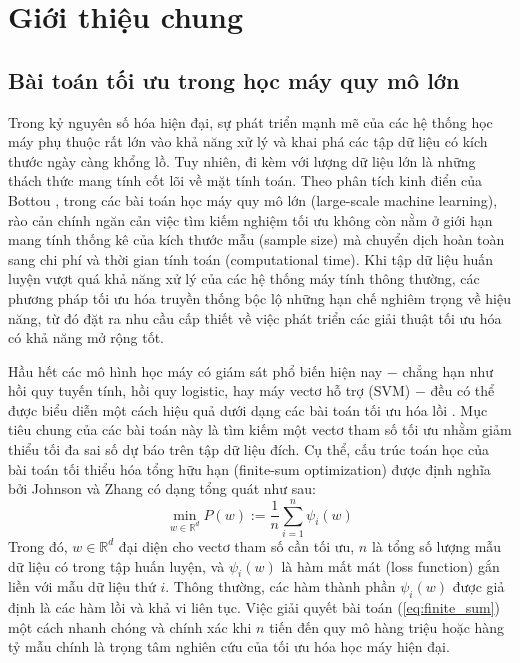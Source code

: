 \chapter{Giới thiệu chung}

\section{Bài toán tối ưu trong học máy quy mô lớn}

Trong kỷ nguyên số hóa hiện đại, sự phát triển mạnh mẽ của các hệ thống học máy phụ thuộc rất lớn vào khả năng xử lý và khai phá các tập dữ liệu có kích thước ngày càng khổng lồ. Tuy nhiên, đi kèm với lượng dữ liệu lớn là những thách thức mang tính cốt lõi về mặt tính toán. Theo phân tích kinh điển của Bottou \cite{bottou2010large}, trong các bài toán học máy quy mô lớn (large-scale machine learning), rào cản chính ngăn cản việc tìm kiếm nghiệm tối ưu không còn nằm ở giới hạn mang tính thống kê của kích thước mẫu (sample size) mà chuyển dịch hoàn toàn sang chi phí và thời gian tính toán (computational time). Khi tập dữ liệu huấn luyện vượt quá khả năng xử lý của các hệ thống máy tính thông thường, các phương pháp tối ưu hóa truyền thống bộc lộ những hạn chế nghiêm trọng về hiệu năng, từ đó đặt ra nhu cầu cấp thiết về việc phát triển các giải thuật tối ưu hóa có khả năng mở rộng tốt.

Hầu hết các mô hình học máy có giám sát phổ biến hiện nay $-$ chẳng hạn như hồi quy tuyến tính, hồi quy logistic, hay máy vectơ hỗ trợ (SVM)  $-$ đều có thể được biểu diễn một cách hiệu quả dưới dạng các bài toán tối ưu hóa lồi \cite{boyd2004convex}. Mục tiêu chung của các bài toán này là tìm kiếm một vectơ tham số tối ưu nhằm giảm thiểu tối đa sai số dự báo trên tập dữ liệu đích. Cụ thể, cấu trúc toán học của bài toán tối thiểu hóa tổng hữu hạn (finite-sum optimization) được định nghĩa bởi Johnson và Zhang \cite{johnson2013accelerating} có dạng tổng quát như sau:
\begin{equation}\label{eq:finite_sum}
\min_{w \in \mathbb{R}^d} P(w) := \frac{1}{n} \sum_{i=1}^{n} \psi_i(w)
\end{equation}
Trong đó, $w \in \mathbb{R}^d$ đại diện cho vectơ tham số cần tối ưu, $n$ là tổng số lượng mẫu dữ liệu có trong tập huấn luyện, và $\psi_i(w)$ là hàm mất mát (loss function) gắn liền với mẫu dữ liệu thứ $i$. Thông thường, các hàm thành phần $\psi_i(w)$ được giả định là các hàm lồi và khả vi liên tục. Việc giải quyết bài toán (\ref{eq:finite_sum}) một cách nhanh chóng và chính xác khi $n$ tiến đến quy mô hàng triệu hoặc hàng tỷ mẫu chính là trọng tâm nghiên cứu của tối ưu hóa học máy hiện đại.

